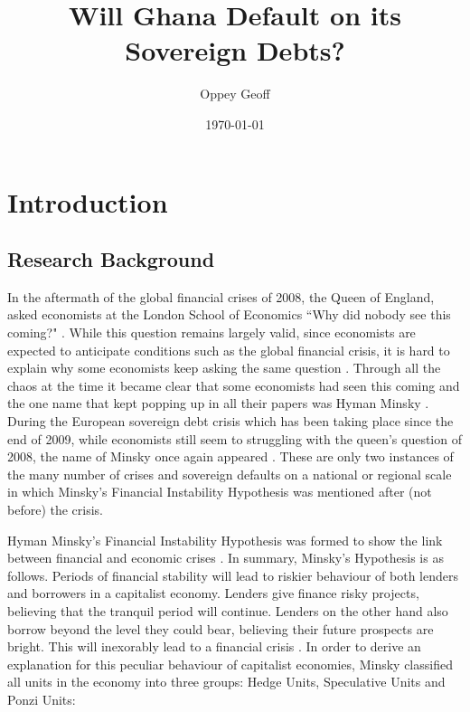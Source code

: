 \documentclass[a4paper]{article}
\author{Oppey Geoff}
\title{Will Ghana Default on its Sovereign Debts?}
\date{\today}
\begin{document}
	\maketitle
	\clearpage
	\tableofcontents
	\newpage
	\doublespacing
	\section{Introduction}
	
	\subsection{Research Background}
	
	In the aftermath of the global financial crises of 2008, the Queen of England, asked economists at the London School of Economics ``Why did nobody see this coming?" \cite{wwwteleg51:online}. While this question remains largely valid, since economists are expected to anticipate conditions such as the global financial crisis, it is hard to explain why some economists keep asking the same question \cite{bezemer2009no} . Through all the chaos at the time it became clear that some economists had seen this coming  and the one name that kept popping up in all their papers was Hyman Minsky \cite{bezemer2009no}. During the European sovereign debt crisis which has been taking place since the end of 2009, while economists still seem to struggling with the queen's question of 2008, the name of Minsky once again appeared \cite{Minsky73:online}. These are only two instances of the many number of crises and sovereign defaults on a national or regional scale in which Minsky's Financial Instability Hypothesis was mentioned after (not before) the crisis.
	
	Hyman Minsky's Financial Instability Hypothesis was formed to show the link between financial and economic crises \cite{Minsky1989}. In summary, Minsky's Hypothesis is as follows. Periods of financial stability will lead to riskier behaviour of both lenders and borrowers in a capitalist economy. Lenders give finance risky projects, believing that the tranquil period will continue. Lenders on the other hand also borrow beyond the level they could bear, believing their future prospects are bright. This will inexorably lead to a financial crisis \cite{Minsky1992}. In order to derive an explanation for this peculiar behaviour of capitalist economies, Minsky classified all units in the economy into three groups: Hedge Units, Speculative Units and Ponzi Units: 
	
\end{document}
